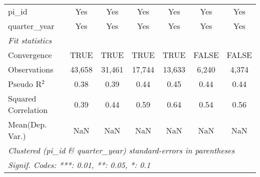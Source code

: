 \begin{tabular}{lcccccc}
   pi\_id                                                     & Yes           & Yes           & Yes           & Yes           & Yes           & Yes\\  
   quarter\_year                                              & Yes           & Yes           & Yes           & Yes           & Yes           & Yes\\  
   \midrule
   \emph{Fit statistics}\\
   Convergence                                                &TRUE           & TRUE          & TRUE          & TRUE          & FALSE         & FALSE\\  
   Observations                                               & 43,658        & 31,461        & 17,744        & 13,633        & 6,240         & 4,374\\  
   Pseudo R$^2$                                               & 0.38          & 0.39          & 0.44          & 0.45          & 0.44          & 0.44\\  
   Squared Correlation                                        & 0.39          & 0.44          & 0.59          & 0.64          & 0.54          & 0.56\\  
Mean(Dep. Var.) & NaN & NaN & NaN & NaN & NaN & NaN \\
   \midrule \midrule
   \multicolumn{7}{l}{\emph{Clustered (pi\_id \& quarter\_year) standard-errors in parentheses}}\\
   \multicolumn{7}{l}{\emph{Signif. Codes: ***: 0.01, **: 0.05, *: 0.1}}\\
\end{tabular}
\par\endgroup
